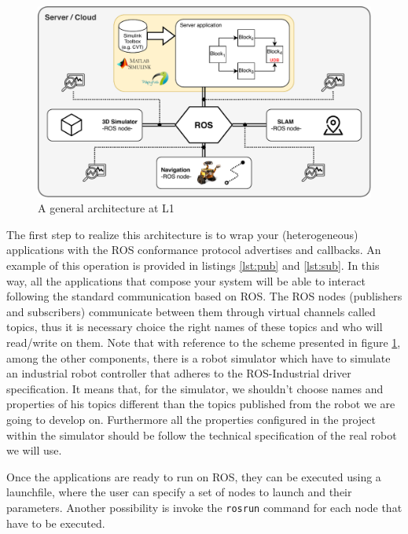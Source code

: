 \begin{figure}[htbp]
	\centering
	\includegraphics[width=\textwidth]{images/L1-arch}
	\caption{A general architecture at L1}
	\label{fig:l1arch}
\end{figure}

The first step to realize this architecture is to wrap your (heterogeneous) applications with the ROS conformance protocol advertises and callbacks. An example of this operation is provided in listings \ref{lst:pub} and \ref{lst:sub}.
In this way, all the applications that compose your system will be able to interact following the standard communication based on ROS.
The ROS nodes (publishers and subscribers) communicate between them through virtual channels called topics, thus it is necessary choice the right names of these topics and who will read/write on them.
Note that with reference to the  scheme presented in figure \ref{fig:l1arch}, among the other components, there is a robot simulator which have to simulate an industrial robot controller that adheres to the ROS-Industrial driver specification. It means that, for the simulator, we shouldn't choose names and properties of his topics different than the topics published from the robot we are going to develop on. Furthermore all the properties configured in the project within the simulator should be follow the technical specification of the real robot we will use.

Once the applications are ready to run on ROS, they can be executed using a launchfile, where the user can specify a set of nodes to launch and their parameters.
Another possibility is invoke the \texttt{rosrun} command for each node that have to be executed.
\\

